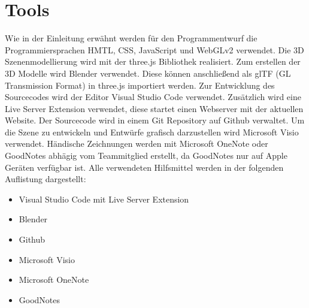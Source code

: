 \section{Tools}
Wie in der Einleitung erwähnt werden für den Programmentwurf die
Programmiersprachen HMTL, CSS, JavaScript und WebGLv2 verwendet.
Die 3D Szenenmodellierung wird mit der three.js Bibliothek realisiert.
Zum erstellen der 3D Modelle wird Blender verwendet. Diese können anschließend als
glTF (GL Transmission Format) in three.js importiert werden.
\newparagraph
Zur Entwicklung des Sourcecodes wird der Editor Visual Studio Code verwendet.
Zusätzlich wird eine Live Server Extension verwendet, diese startet einen Webserver mit der aktuellen Website.
Der Sourcecode wird in einem Git Repository auf Github verwaltet.
\newparagraph
Um die Szene zu entwickeln und Entwürfe grafisch darzustellen wird Microsoft Visio verwendet.
Händische Zeichnungen werden mit Microsoft OneNote oder GoodNotes abhägig vom Teammitglied erstellt,
da GoodNotes nur auf Apple Geräten verfügbar ist.
\newparagraph
Alle verwendeten Hilfsmittel werden in der folgenden Auflistung dargestellt:
\begin{itemize}
  \item Visual Studio Code mit Live Server Extension
  \item Blender
  \item Github
  \item Microsoft Visio
  \item Microsoft OneNote
  \item GoodNotes
\end{itemize}

